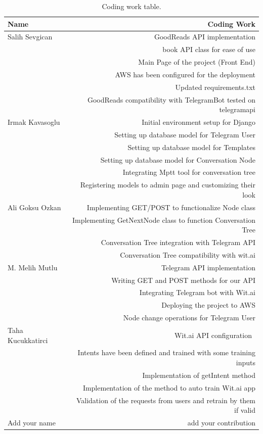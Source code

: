 \documentclass[a4paper]{article}
\begin{document}
\begin{table}[!hb]
\centering
\begin{tabular}{l|r}
Name & Coding Work \\\hline
Salih Sevgican & GoodReads API implementation \\ 
 & book API class for ease of use \\
 & Main Page of the project (Front End)\\
 & AWS has been configured for the deployment\\
 & Updated requirements.txt\\
 & GoodReads compatibility with TelegramBot tested on telegramapi\\\hline
Irmak Kavasoglu & Initial environment setup for Django \\
& Setting up database model for Telegram User \\
& Setting up database model for Templates \\
& Setting up database model for Conversation Node \\
& Integrating Mptt tool for conversation tree \\
& Registering models to admin page and customizing their look \\\hline
Ali Goksu Ozkan & Implementing GET/POST to functionalize Node class \\
& Implementing GetNextNode class to function Conversation Tree \\
&  Conversation Tree integration with Telegram API\\
&  Conversation Tree compatibility with wit.ai\\\hline
M. Melih Mutlu & Telegram API implementation \\ 
 & Writing GET and POST methods for our API \\
 & Integrating Telegram bot with Wit.ai\\
 & Deploying the project to AWS \\
 & Node change operations for Telegram User \\\hline
Taha Kucukkatirci & Wit.ai API configuration \\
& Intents have been defined and trained with some training inputs\\
& Implementation of getIntent method \\
& Implementation of the method to auto train Wit.ai app \\
& Validation of the requests from users and retrain by them if valid \\\hline
Add your name & add your contribution
\end{tabular}
\caption{\label{tab:codingwork}Coding work table.}
\end{table}
\end{document}
